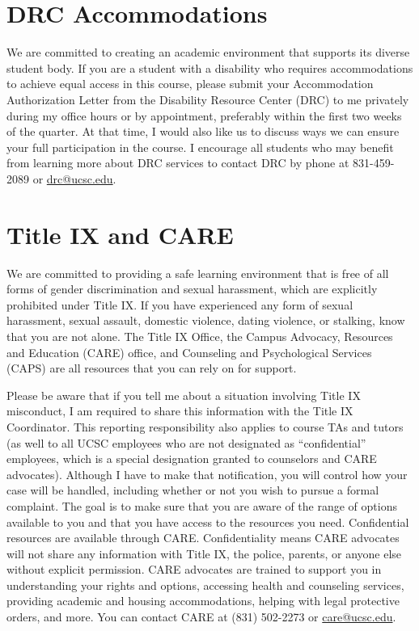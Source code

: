 \documentclass{article}
\begin{document}

\section{DRC Accommodations}
We are committed to creating an academic environment that
supports its diverse student body. If you are a student with a
disability who requires accommodations to achieve equal access in
this course, please submit your Accommodation Authorization Letter
from the Disability Resource Center (DRC) to me privately during
my office hours or by appointment, preferably within the first two
weeks of the quarter. At that time, I would also like us to discuss
ways we can ensure your full participation in the course. I encourage
all students who may benefit from learning more about DRC services
to contact DRC by phone at 831-459-2089 or \url{drc@ucsc.edu}.

\section{Title IX and CARE}
We are committed to providing a safe learning environment
that is free of all forms of gender discrimination and sexual
harassment, which are explicitly prohibited under Title IX. If you
have experienced any form of sexual harassment, sexual assault,
domestic violence, dating violence, or stalking, know that you are
not alone. The Title IX Office, the Campus Advocacy, Resources and
Education (CARE) office, and Counseling and Psychological Services
(CAPS) are all resources that you can rely on for support.  

Please
be aware that if you tell me about a situation involving Title IX
misconduct, I am required to share this information with the Title
IX Coordinator. This reporting responsibility also applies to course
TAs and tutors (as well to all UCSC employees who are not designated
as ``confidential'' employees, which is a special designation granted
to counselors and CARE advocates). Although I have to make that
notification, you will control how your case will be handled,
including whether or not you wish to pursue a formal complaint. The
goal is to make sure that you are aware of the range of options
available to you and that you have access to the resources you need.
Confidential resources are available through CARE. Confidentiality
means CARE advocates will not share any information with Title IX,
the police, parents, or anyone else without explicit permission.
CARE advocates are trained to support you in understanding your
rights and options, accessing health and counseling services,
providing academic and housing accommodations, helping with legal
protective orders, and more. You can contact CARE at (831) 502-2273
or \url{care@ucsc.edu}.  
\end{document}
